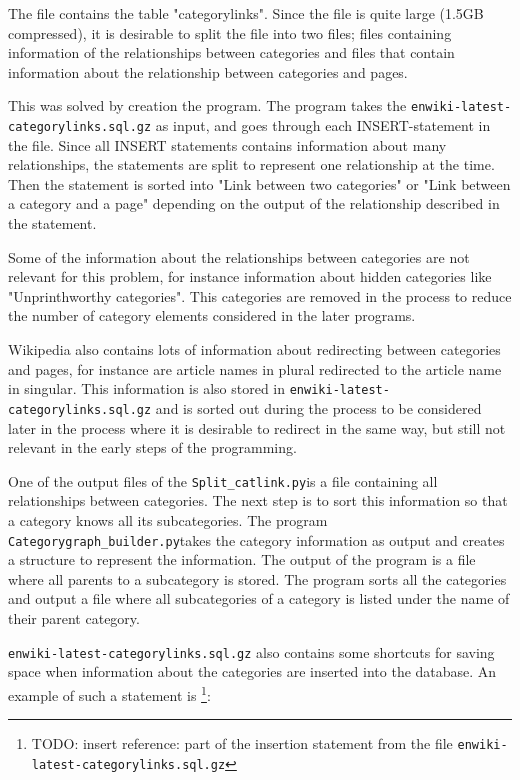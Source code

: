 \documentclass[11pt,english,a4paper]{article}
\newcommand{\enwikicatlink}{\texttt{enwiki-latest-categorylinks.sql.gz} }
\newcommand{\catlinkprogram}{\texttt{Split\_catlink.py}}
\newcommand{\catgraphbuilderprogram}{\texttt{Categorygraph\_builder.py}}
\begin{document}
The file contains the table "categorylinks". Since the file is quite large (1.5GB compressed), it is desirable to split the file into two files; files containing information of the relationships between categories and files that contain information about the relationship between categories and pages. 

This was solved by creation the program. The program takes the \enwikicatlink as input, and goes through each INSERT-statement in the file. Since all INSERT statements contains information about many relationships, the statements are split to represent one relationship at the time. Then the statement is sorted into "Link between two categories" or "Link between a category and a page" depending on the output of the relationship described in the statement. 

Some of the information about the relationships between categories are not relevant for this problem, for instance information about hidden categories like "Unprinthworthy categories". This categories are removed in the process to reduce the number of category elements considered in the later programs. 

Wikipedia also contains lots of information about redirecting between categories and pages, for instance are article names in plural redirected to the article name in singular.  This information is also stored in \enwikicatlink and is sorted out during the process to be considered later in the process where it is desirable to redirect in the same way, but still not relevant in the early steps of the programming. 

One of the output files of the \catlinkprogram is a file containing all relationships between categories. The next step is to sort this information so that a category knows all its subcategories. The program \catgraphbuilderprogram takes the category information as output and creates a structure to represent the information. The output of the program is a file where all parents to a subcategory is stored. %
The program sorts all the categories and output a file where all subcategories of a category is listed under the name of their parent category.

\enwikicatlink also contains some shortcuts for saving space when information about the categories are inserted into the database. An example of such a statement is \footnote{TODO: insert reference: part of the insertion statement from the file \enwikicatlink}: 
\end{document}
